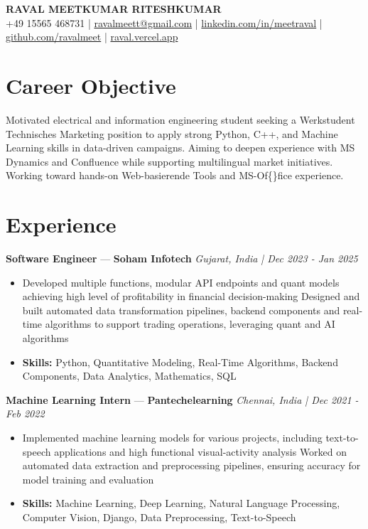 \documentclass[a4paper,10pt]{article}
\begin{document}
\begin{center}
  {\Large\bfseries RAVAL MEETKUMAR RITESHKUMAR}\\[2pt]
  {\small +49 15565 468731 \;|\; \href{mailto:ravalmeett@gmail.com}{ravalmeett@gmail.com} \;|\; \href{https://www.linkedin.com/in/meetraval/}{linkedin.com/in/meetraval} \;|\; \href{https://github.com/ravalmeet}{github.com/ravalmeet} \;|\; \href{https://raval.vercel.app/}{raval.vercel.app}}
\end{center}
\vspace{-3pt}

\section*{Career Objective}
Motivated electrical and information engineering student seeking a Werkstudent Technisches Marketing position to apply strong Python, C++, and Machine Learning skills in data-driven campaigns. Aiming to deepen experience with MS Dynamics and Confluence while supporting multilingual market initiatives. Working toward hands-on Web-basierende Tools and MS-Of\{\}fice experience.\par

\section*{Experience}
\textbf{Software Engineer} — \textbf{Soham Infotech} \hfill \textit{Gujarat, India \;|\; Dec 2023 - Jan 2025}\par
\vspace{1pt}
\begin{itemize}
  \item Developed multiple functions, modular API endpoints and quant models achieving high level of profitability in financial decision-making Designed and built automated data transformation pipelines, backend components and real-time algorithms to support trading operations, leveraging quant and AI algorithms
  \item \textbf{Skills:} Python, Quantitative Modeling, Real-Time Algorithms, Backend Components, Data Analytics, Mathematics, SQL
\end{itemize}
\vspace{3pt}
\textbf{Machine Learning Intern} — \textbf{Pantechelearning} \hfill \textit{Chennai, India \;|\; Dec 2021 - Feb 2022}\par
\vspace{1pt}
\begin{itemize}
  \item Implemented machine learning models for various projects, including text-to-speech applications and high functional visual-activity analysis Worked on automated data extraction and preprocessing pipelines, ensuring accuracy for model training and evaluation
  \item \textbf{Skills:} Machine Learning, Deep Learning, Natural Language Processing, Computer Vision, Django, Data Preprocessing, Text-to-Speech
\end{itemize}
\end{document}
